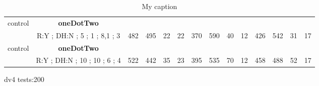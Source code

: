 \begin{table}[]
{\begin{tabular}{|c|c|c|c|c|c|c|c|c|c|c|c|c|c|}
control & \cellcolor{blue!15}\textbf{oneDotTwo}& {\color[HTML]{00009B} } & {\color[HTML]{9A0000} } & {\color[HTML]{009901} } &  & {\color[HTML]{00009B} } & {\color[HTML]{9A0000} } & {\color[HTML]{009901} } &  & {\color[HTML]{00009B} } & {\color[HTML]{9A0000} } & {\color[HTML]{009901} } &  \\ 
 & \cellcolor{ blue!15}R:Y ; DH:N ; 5 ; 1 ; 8,1 ; 3 & \multirow{-2}{*}{{\color[HTML]{00009B} 482}} & \multirow{-2}{*}{{\color[HTML]{9A0000} 495}} & \multirow{-2}{*}{{\color[HTML]{009901} 22}} & \multirow{-2}{*}{22} & \multirow{-2}{*}{{\color[HTML]{00009B} 370}} & \multirow{-2}{*}{{\color[HTML]{9A0000} 590}} & \multirow{-2}{*}{{\color[HTML]{009901} 40}} & \multirow{-2}{*}{12} & \multirow{-2}{*}{{\color[HTML]{00009B} 426}} & \multirow{-2}{*}{{\color[HTML]{9A0000} 542}} & \multirow{-2}{*}{{\color[HTML]{009901} 31}} & \multirow{-2}{*}{17} \\ \hline

control & \cellcolor{blue!15}\textbf{oneDotTwo}& {\color[HTML]{00009B} } & {\color[HTML]{9A0000} } & {\color[HTML]{009901} } &  & {\color[HTML]{00009B} } & {\color[HTML]{9A0000} } & {\color[HTML]{009901} } &  & {\color[HTML]{00009B} } & {\color[HTML]{9A0000} } & {\color[HTML]{009901} } &  \\ 
 & \cellcolor{ blue!15}R:Y ; DH:N ; 10 ; 10 ; 6 ; 4 & \multirow{-2}{*}{{\color[HTML]{00009B} 522}} & \multirow{-2}{*}{{\color[HTML]{9A0000} 442}} & \multirow{-2}{*}{{\color[HTML]{009901} 35}} & \multirow{-2}{*}{23} & \multirow{-2}{*}{{\color[HTML]{00009B} 395}} & \multirow{-2}{*}{{\color[HTML]{9A0000} 535}} & \multirow{-2}{*}{{\color[HTML]{009901} 70}} & \multirow{-2}{*}{12} & \multirow{-2}{*}{{\color[HTML]{00009B} 458}} & \multirow{-2}{*}{{\color[HTML]{9A0000} 488}} & \multirow{-2}{*}{{\color[HTML]{009901} 52}} & \multirow{-2}{*}{17} \\ \hline
\end{tabular}} \caption{ My caption} \label{ my - label} \end{table}


dv4 tests:200

